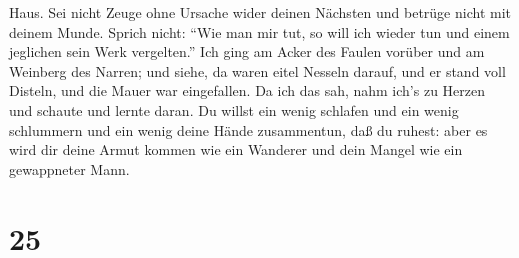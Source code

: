 Haus.  Sei nicht Zeuge ohne Ursache wider deinen Nächsten
und betrüge nicht mit deinem Munde.  Sprich nicht: ``Wie
man mir tut, so will ich wieder tun und einem jeglichen sein Werk
vergelten.''  Ich ging am Acker des Faulen vorüber und am
Weinberg des Narren;  und siehe, da waren eitel Nesseln
darauf, und er stand voll Disteln, und die Mauer war eingefallen.
 Da ich das sah, nahm ich's zu Herzen und schaute und
lernte daran.  Du willst ein wenig schlafen und ein wenig
schlummern und ein wenig deine Hände zusammentun, daß du ruhest:
 aber es wird dir deine Armut kommen wie ein Wanderer und
dein Mangel wie ein gewappneter Mann.

\hypertarget{section-24}{%
\section{25}\label{section-24}}

